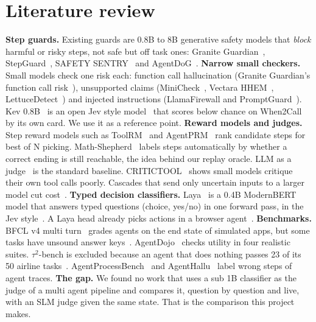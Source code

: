 \documentclass[10pt,a4paper]{article}
\begin{document}
\section{Literature review}\label{sec:lit}
\textbf{Step guards.} Existing guards are 0.8B to 8B generative safety models that \emph{block} harmful or risky steps, not safe but off task ones: Granite Guardian~\cite{granite}, StepGuard~\cite{stepguard}, SAFETY SENTRY~\cite{sentry} and AgentDoG~\cite{agentdog}.
\textbf{Narrow small checkers.} Small models check one risk each: function call hallucination (Granite Guardian's function call risk~\cite{granite}), unsupported claims (MiniCheck~\cite{minicheck}, Vectara HHEM~\cite{hhem}, LettuceDetect~\cite{lettuce}) and injected instructions (LlamaFirewall and PromptGuard~\cite{llamafirewall}). Kev 0.8B~\cite{kev} is an open Jev style model~\cite{typesafe} that scores below chance on When2Call~\cite{when2call} by its own card. We use it as a reference point.
\textbf{Reward models and judges.} Step reward models such as ToolRM~\cite{toolrm} and AgentPRM~\cite{agentprm} rank candidate steps for best of N picking. Math-Shepherd~\cite{mathshepherd} labels steps automatically by whether a correct ending is still reachable, the idea behind our replay oracle. LLM as a judge~\cite{zheng2023judge} is the standard baseline. CRITICTOOL~\cite{critictool} shows small models critique their own tool calls poorly. Cascades that send only uncertain inputs to a larger model cut cost~\cite{frugalgpt}.
\textbf{Typed decision classifiers.} Laya~\cite{laya} is a 0.4B ModernBERT~\cite{modernbert} model that answers typed questions (choice, yes/no) in one forward pass, in the Jev style~\cite{typesafe}. A Laya head already picks actions in a browser agent~\cite{layabrowser}.
\textbf{Benchmarks.} BFCL v4 multi turn~\cite{bfcl} grades agents on the end state of simulated apps, but some tasks have unsound answer keys~\cite{bfclissues}. AgentDojo~\cite{agentdojo} checks utility in four realistic suites. $\tau^2$-bench is excluded because an agent that does nothing passes 23 of its 50 airline tasks~\cite{tau2}. AgentProcessBench~\cite{agentprocessbench} and AgentHallu~\cite{agenthallu} label wrong steps of agent traces.
\textbf{The gap.} We found no work that uses a sub 1B classifier as the judge of a multi agent pipeline and compares it, question by question and live, with an SLM judge given the same state. That is the comparison this project makes.
\end{document}
